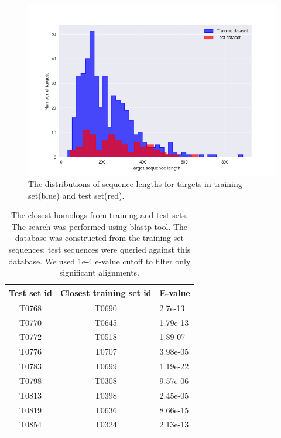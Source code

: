 \documentclass[a4paper,10pt]{article}
\begin{document}
\begin{figure}[H]
    \centering
    \includegraphics[width=\linewidth]{Fig/datasetLengthDistributions.png}
    \caption{The distributions of sequence lengths for targets in training set(blue) and test set(red).}
    \label{Fig:dataLengthDist}
\end{figure}

\begin{table}[H]
\begin{center}
\begin{tabular}{ c | c | l }
    
    Test set id & Closest training set id & E-value \\
    \hline
    T0768 & T0690 & 2.7e-13\\
    T0770 & T0645 & 1.79e-13\\
    T0772 & T0518 & 1.89-07\\
    T0776 & T0707 & 3.98e-05\\
    T0783 & T0699 & 1.19e-22\\
    T0798 & T0308 & 9.57e-06\\
    T0813 & T0398 & 2.45e-05\\
    T0819 & T0636 & 8.66e-15\\
    T0854 & T0324 & 2.13e-13\\
\end{tabular}
    
    \caption {The closest homologs from training and test sets. The search was performed using blastp tool. The database was constructed from 
    the training set sequences; test sequences were queried against this database. We used 1e-4 e-value cutoff to filter only significant 
    alignments.}
    \label{Tbl:datasetsSimilarity}
\end{center}
\end{table}
\end{document}
